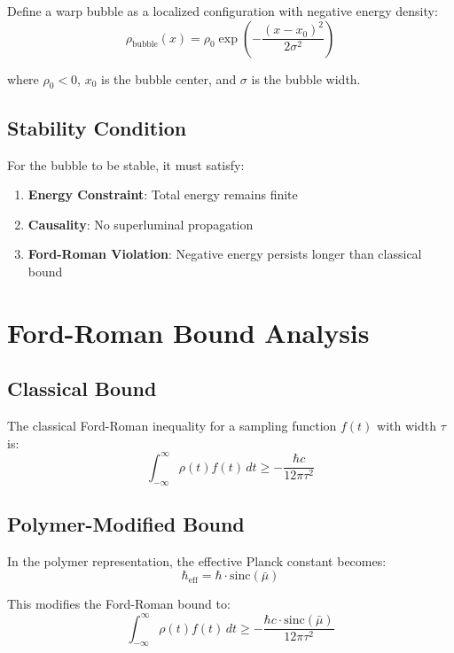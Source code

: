 \documentclass[12pt]{article}
\begin{document}
Define a warp bubble as a localized configuration with negative energy density:
\begin{equation}
\rho_{\text{bubble}}(x) = \rho_0 \exp\left(-\frac{(x-x_0)^2}{2\sigma^2}\right)
\end{equation}

where $\rho_0 < 0$, $x_0$ is the bubble center, and $\sigma$ is the bubble width.

\subsection{Stability Condition}

For the bubble to be stable, it must satisfy:
\begin{enumerate}
\item \textbf{Energy Constraint}: Total energy remains finite
\item \textbf{Causality}: No superluminal propagation
\item \textbf{Ford-Roman Violation}: Negative energy persists longer than classical bound
\end{enumerate}

\section{Ford-Roman Bound Analysis}

\subsection{Classical Bound}

The classical Ford-Roman inequality for a sampling function $f(t)$ with width $\tau$ is:
\begin{equation}
\int_{-\infty}^{\infty} \rho(t) f(t) \, dt \geq -\frac{\hbar c}{12\pi \tau^2}
\end{equation}

\subsection{Polymer-Modified Bound}

In the polymer representation, the effective Planck constant becomes:
\begin{equation}
\hbar_{\text{eff}} = \hbar \cdot \text{sinc}(\bar{\mu})
\end{equation}

This modifies the Ford-Roman bound to:
\begin{equation}
\int_{-\infty}^{\infty} \rho(t) f(t) \, dt \geq -\frac{\hbar c \cdot \text{sinc}(\bar{\mu})}{12\pi \tau^2}
\end{equation}
\end{document}
